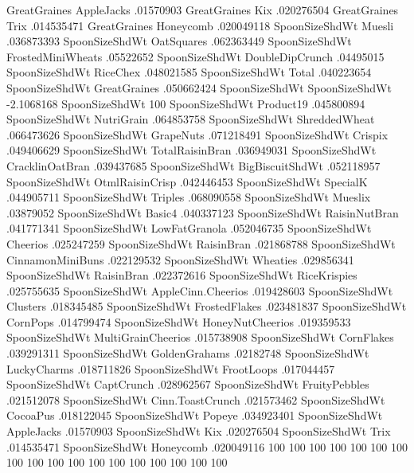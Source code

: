 GreatGraines	AppleJacks	.01570903
GreatGraines	Kix	.020276504
GreatGraines	Trix	.014535471
GreatGraines	Honeycomb	.020049118
SpoonSizeShdWt	Muesli	.036873393
SpoonSizeShdWt	OatSquares	.062363449
SpoonSizeShdWt	FrostedMiniWheats	.05522652
SpoonSizeShdWt	DoubleDipCrunch	.04495015
SpoonSizeShdWt	RiceChex	.048021585
SpoonSizeShdWt	Total	.040223654
SpoonSizeShdWt	GreatGraines	.050662424
SpoonSizeShdWt	SpoonSizeShdWt	-2.1068168
SpoonSizeShdWt	100%
SpoonSizeShdWt	Product19	.045800894
SpoonSizeShdWt	NutriGrain	.064853758
SpoonSizeShdWt	ShreddedWheat	.066473626
SpoonSizeShdWt	GrapeNuts	.071218491
SpoonSizeShdWt	Crispix	.049406629
SpoonSizeShdWt	TotalRaisinBran	.036949031
SpoonSizeShdWt	CracklinOatBran	.039437685
SpoonSizeShdWt	BigBiscuitShdWt	.052118957
SpoonSizeShdWt	OtmlRaisinCrisp	.042446453
SpoonSizeShdWt	SpecialK	.044905711
SpoonSizeShdWt	Triples	.068090558
SpoonSizeShdWt	Mueslix	.03879052
SpoonSizeShdWt	Basic4	.040337123
SpoonSizeShdWt	RaisinNutBran	.041771341
SpoonSizeShdWt	LowFatGranola	.052046735
SpoonSizeShdWt	Cheerios	.025247259
SpoonSizeShdWt	RaisinBran	.021868788
SpoonSizeShdWt	CinnamonMiniBuns	.022129532
SpoonSizeShdWt	Wheaties	.029856341
SpoonSizeShdWt	RaisinBran	.022372616
SpoonSizeShdWt	RiceKrispies	.025755635
SpoonSizeShdWt	AppleCinn.Cheerios	.019428603
SpoonSizeShdWt	Clusters	.018345485
SpoonSizeShdWt	FrostedFlakes	.023481837
SpoonSizeShdWt	CornPops	.014799474
SpoonSizeShdWt	HoneyNutCheerios	.019359533
SpoonSizeShdWt	MultiGrainCheerios	.015738908
SpoonSizeShdWt	CornFlakes	.039291311
SpoonSizeShdWt	GoldenGrahams	.02182748
SpoonSizeShdWt	LuckyCharms	.018711826
SpoonSizeShdWt	FrootLoops	.017044457
SpoonSizeShdWt	CaptCrunch	.028962567
SpoonSizeShdWt	FruityPebbles	.021512078
SpoonSizeShdWt	Cinn.ToastCrunch	.021573462
SpoonSizeShdWt	CocoaPus	.018122045
SpoonSizeShdWt	Popeye	.034923401
SpoonSizeShdWt	AppleJacks	.01570903
SpoonSizeShdWt	Kix	.020276504
SpoonSizeShdWt	Trix	.014535471
SpoonSizeShdWt	Honeycomb	.020049116
100%
100%
100%
100%
100%
100%
100%
100%
100%
100%
100%
100%
100%
100%
100%
100%
100%
100%
